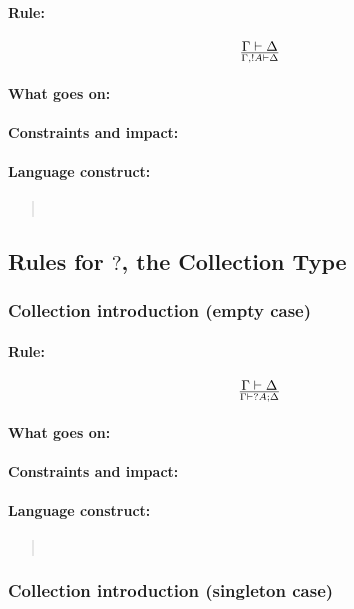 \documentclass[a4paper]{article}
\begin{document}
\paragraph{Rule:}
$$
{
  \Gamma \vdash \Delta
}\over{
  \Gamma, !A \vdash \Delta
}
$$
\paragraph{What goes on:}
\paragraph{Constraints and impact:}
\paragraph{Language construct:}
\begin{quote}\tt
\end{quote}


\subsection{Rules for $?$, the Collection Type}

\subsubsection{Collection introduction (empty case)}
\paragraph{Rule:}
$$
{
  \Gamma \vdash \Delta
}\over{
  \Gamma \vdash ?A;\Delta
}
$$
\paragraph{What goes on:}
\paragraph{Constraints and impact:}
\paragraph{Language construct:}
\begin{quote}\tt
\end{quote}

\subsubsection{Collection introduction (singleton case)}
\end{document}
